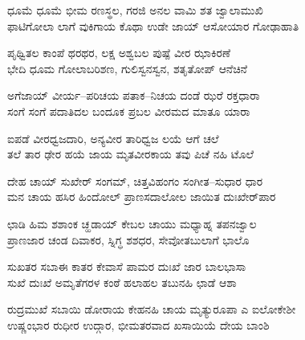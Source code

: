 
\begin{myquote}
ಧೂಮೆ ಧೂಮೆ ಭೀಮ ರಣಸ್ಥಲ, ಗರಜಿ ಅನಲ ವಾಮಿ ಶತ ಜ್ವಾಲಾಮುಖಿ\\ಫಾಟಿಗೋಲಾ ಲಾಗೆ ವುಕಿಗಾಯ ಕೊಥಾ ಉಡೇ ಜಾಯ್ ಆಸೋಯಾರ ಗೋಢಾಹಾತಿ
\end{myquote}


\begin{myquote}
ಪೃಥ್ವಿತಲ ಕಾಂಪೆ ಥರಥರ, ಲಕ್ಷ ಅಶ್ವಬಲ ಪುಷ್ಪೆ ವೀರ ಝಾಕಿರಣೆ\\ಭೇದಿ ಧೂಮ ಗೋಲಾಬರಿಶಣ, ಗುಲಿಸ್ವನಸ್ವನ, ಶತೃತೋಪ್ ಆನೆಚಿನೆ
\end{myquote}


\begin{myquote}
ಅಗೆಜಾಯ್ ವೀರ್ಯ–ಪರಿಚಯ ಪತಾಕ–ನಿಚಯ ದಂಡೆ ಝರೆ ರಕ್ತಧಾರಾ\\ಸಂಗೆ ಸಂಗೆ ಪದಾತಿದಲ ಬಂದೂಕ ಪ್ರಬಲ ವೀರಮದ ಮಾತೂ ಯಾರಾ
\end{myquote}


\begin{myquote}
ಐಪಡೆ ವೀರಧ್ವಜದಾರಿ, ಅನ್ಯವೀರ ತಾರಿಧ್ವಜ ಲಯೆ ಆಗೆ ಚಲೆ\\ತಲೆ ತಾರ ಢೇರ ಹಯೆ ಜಾಯ ಮೃತವೀರಕಾಯ ತವು ಪಿಚೆ ನಹಿ ಟೊಲೆ
\end{myquote}


\begin{myquote}
ದೇಹ ಚಾಯ್ ಸುಖೇರ್ ಸಂಗಮ್, ಚಿತ್ತವಿಹಂಗಂ ಸಂಗೀತ–ಸುಧಾರ ಧಾರ\\ಮನ ಚಾಯ ಹಸಿರ ಹಿಂದೋಲ್ ಪ್ರಾಣಸದಾಲೋಲ ಜಾಯಿತ ದುಃಖೇರ್‌ಪಾರ
\end{myquote}


\begin{myquote}
ಛಾಡಿ ಹಿಮ ಶಶಾಂಕ ಚ್ಹಡಾಯ್ ಕೇಬಲ ಚಾಯು ಮಧ್ಯಾಹ್ನ ತಪನಜ್ವಾಲ\\ಪ್ರಾಣಜಾರ ಚಂಡ ದಿವಾಕರ, ಸ್ನಿಗ್ಧ ಶಶಧರ, ಸೇವೋತಬುಲಾಗೆ ಭಾಲೊ
\end{myquote}


\begin{myquote}
ಸುಖತರ ಸಬಾಈ ಕಾತರ ಕೇವಾಸೆ ಪಾಮರ ದುಃಖೆ ಜಾರ ಬಾಲಭಾಸಾ\\ಸುಖೆ ದುಃಖೆ ಅಮೃತೆಗರಳ ಕಂಠೆ ಹಲಾಹಲ ತಬುನಹಿ ಛಾಡೆ ಆಶಾ
\end{myquote}


\begin{myquote}
ರುದ್ರಮುಖೆ ಸಬಾಯಿ ಡೋರಾಯ ಕೇಹನಹಿ ಚಾಯ ಮೃತ್ಯುರೂಪಾ ಎ ಐಲೋಕೇಶೀ\\ಉಷ್ಣಂಭಾರ ರುಧೀರ ಉದ್ಗಾರ, ಭೀಮತರವಾದ ಖಸಾಯಿಯೆ ದೇಯ ಬಾಂಶಿ
\end{myquote}

